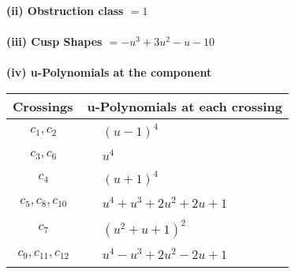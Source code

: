 \documentclass[1p]{elsarticle_modified}
\theoremstyle{definition}
\begin{document}
\flushleft \textbf{(ii) Obstruction class $= 1$}\\~\\
\flushleft \textbf{(iii) Cusp Shapes $= - u^3+3 u^2- u-10$}\\~\\
\newpage\renewcommand{\arraystretch}{1}
\flushleft \textbf{(iv) u-Polynomials at the component}\newline \\
\begin{tabular}{m{50pt}|m{274pt}}
Crossings & \hspace{64pt}u-Polynomials at each crossing \\
\hline $$\begin{aligned}c_{1},c_{2}\end{aligned}$$&$\begin{aligned}
&(u-1)^4
\end{aligned}$\\
\hline $$\begin{aligned}c_{3},c_{6}\end{aligned}$$&$\begin{aligned}
&u^4
\end{aligned}$\\
\hline $$\begin{aligned}c_{4}\end{aligned}$$&$\begin{aligned}
&(u+1)^4
\end{aligned}$\\
\hline $$\begin{aligned}c_{5},c_{8},c_{10}\end{aligned}$$&$\begin{aligned}
&u^4+u^3+2 u^2+2 u+1
\end{aligned}$\\
\hline $$\begin{aligned}c_{7}\end{aligned}$$&$\begin{aligned}
&(u^2+u+1)^2
\end{aligned}$\\
\hline $$\begin{aligned}c_{9},c_{11},c_{12}\end{aligned}$$&$\begin{aligned}
&u^4- u^3+2 u^2-2 u+1
\end{aligned}$\\
\hline
\end{tabular}\\~\\
\end{document}
